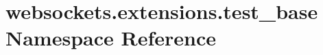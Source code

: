 \hypertarget{namespacewebsockets_1_1extensions_1_1test__base}{}\section{websockets.\+extensions.\+test\+\_\+base Namespace Reference}
\label{namespacewebsockets_1_1extensions_1_1test__base}
